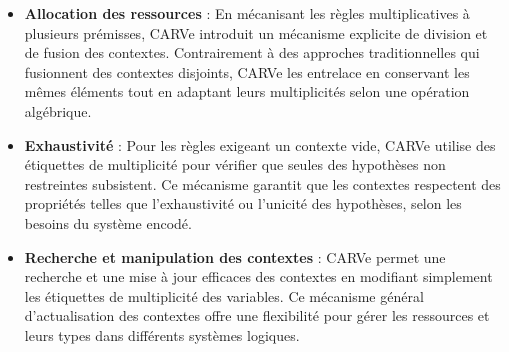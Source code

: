 \begin{itemize}
    \item \textbf{Allocation des ressources} : En mécanisant les règles multiplicatives à plusieurs prémisses, CARVe introduit un mécanisme explicite de division et de fusion des contextes. Contrairement à des approches traditionnelles qui fusionnent des contextes disjoints, CARVe les entrelace en conservant les mêmes éléments tout en adaptant leurs multiplicités selon une opération algébrique.
    \item \textbf{Exhaustivité} : Pour les règles exigeant un contexte vide, CARVe utilise des étiquettes de multiplicité pour vérifier que seules des hypothèses non restreintes subsistent. Ce mécanisme garantit que les contextes respectent des propriétés telles que l'exhaustivité ou l'unicité des hypothèses, selon les besoins du système encodé.
    \item \textbf{Recherche et manipulation des contextes} : CARVe permet une recherche et une mise à jour efficaces des contextes en modifiant simplement les étiquettes de multiplicité des variables. Ce mécanisme général d'actualisation des contextes offre une flexibilité pour gérer les ressources et leurs types dans différents systèmes logiques.
\end{itemize}

